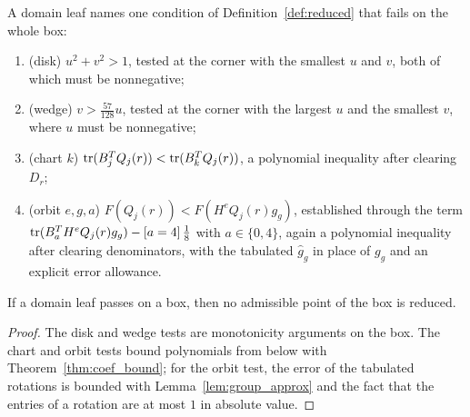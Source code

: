 \begin{definition}
\label{def:dom_leaf}
\leanok
{}
A domain leaf names one condition of Definition~\ref{def:reduced} that fails on the whole
box:
\begin{enumerate}
\item (disk) $u^2 + v^2 > 1$, tested at the corner with the smallest $u$ and $v$, both of
  which must be nonnegative;
\item (wedge) $v > \frac{57}{128} u$, tested at the corner with the largest $u$ and the
  smallest $v$, where $u$ must be nonnegative;
\item (chart $k$) $\operatorname{\mathrm{tr}}(B_j^T Q_j(r)) < \operatorname{\mathrm{tr}}(B_k^T Q_j(r))$, a polynomial inequality after
  clearing $D_r$;
\item (orbit $e, g, a$) $F(Q_j(r)) < F(H^e Q_j(r) g_g)$, established through the term
  $\operatorname{\mathrm{tr}}(B_a^T H^e Q_j(r) g_g) - [a = 4]\,\frac18$ with $a \in \{0, 4\}$, again a polynomial
  inequality after clearing denominators, with the tabulated $\hat g_g$ in place of $g_g$
  and an explicit error allowance.
\end{enumerate}
\end{definition}

\begin{theorem}
\label{thm:dom_leaf_sound}
\leanok
{}
If a domain leaf passes on a box, then no admissible point of the box is reduced.
\end{theorem}
\begin{proof}
\leanok
The disk and wedge tests are monotonicity arguments on the box. The chart and orbit
tests bound polynomials from below with Theorem~\ref{thm:coef_bound}; for the orbit test,
the error of the tabulated rotations is bounded with Lemma~\ref{lem:group_approx} and the
fact that the entries of a rotation are at most $1$ in absolute value.
\end{proof}
